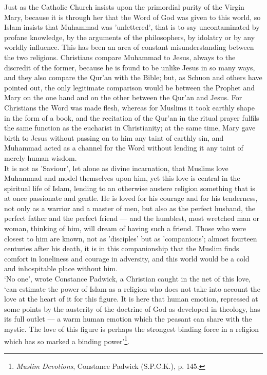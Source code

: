 \documentclass[10pt, twoside,openright]{book}
\begin{document}
Just as the Catholic Church insists upon the primordial purity of the Virgin Mary, because it is 
through her that the Word of God was given to this world, so Islam insists that Muhammad was 
'unlettered', that is to say uncontaminated by profane knowledge, by the arguments of the 
philosophers, by idolatry or by any worldly influence. This has been an area of constant 
misunderstanding between the two religions. Christians compare Muhammad to Jesus, always to the 
discredit of the former, because he is found to be unlike Jesus in so many ways, and they also 
compare the Qur'an with the Bible; but, as Schuon and others have pointed out, the only legitimate 
comparison would be between the Prophet and Mary on the one hand and on the other between the Qur'an and Jesus. For Christians the Word was made flesh, whereas for Muslims it took earthly shape in the form of a book, and the recitation of the Qur'an in the ritual prayer fulfils the same function as 
the eucharist in Christianity; at the same time, Mary gave birth to Jesus without passing on to him 
any taint of earthly sin, and Muhammad acted as a channel for the Word without lending it any taint 
of merely human wisdom. \\

It is not as 'Saviour', let alone as divine incarnation, that Muslims love Muhammad and model 
themselves upon him, yet this love is central in the spiritual life of Islam, lending to an otherwise 
austere religion something that is at once passionate and gentle. He is loved for his courage and for 
his tenderness, not only as a warrior and a master of men, but also as the perfect husband, the 
perfect father and the perfect friend --- and the humblest, most wretched man or woman, thinking of 
him, will dream of having such a friend. Those who were closest to him are known, not as 'disciples' 
but as 'companions'; almost fourteen centuries after his death, it is in this companionship that the 
Muslim finds comfort in loneliness and courage in adversity, and this world would be a cold and 
inhospitable place without him. \\

`No one', wrote Constance Padwick, a Christian caught in the net of this love, `can estimate the 
power of Islam as a religion who does not take into account the love at the heart of it for this 
figure. It is here that human emotion, repressed at some points by the austerity of the doctrine of 
God as developed in theology, has its full outlet --- a warm human emotion which the peasant can share 
with the mystic. The love of this figure is perhaps the strongest binding force in a religion which 
has so marked a binding power'\footnote{\emph{Muslim Devotions}, Constance Padwick (S.P.C.K.), p. 145.}. \\
\end{document}
